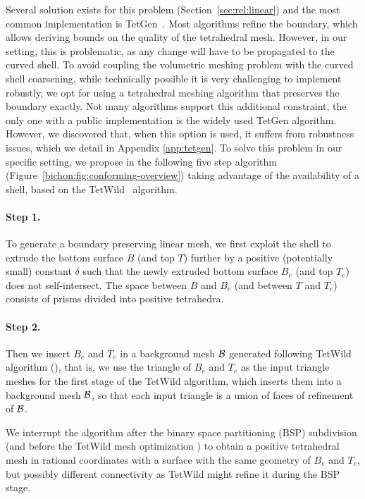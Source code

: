 Several solution exists for this problem (Section~\ref{sec:rel:linear}) and the most common implementation is TetGen~\cite{tetgen}. Most algorithms refine the boundary, which allows {deriving} bounds on the quality of the tetrahedral mesh. However, in our setting, this is problematic, as any change will have to be propagated to the curved shell. To avoid coupling the volumetric meshing problem with the curved shell coarsening, while technically possible it is very challenging to implement robustly, we opt for using a tetrahedral meshing algorithm that preserves the boundary exactly. Not many algorithms support this additional constraint, the only one with a public implementation is the widely used TetGen algorithm. However, we discovered that, when this option is used, it suffers from robustness issues, which we detail in Appendix \ref{app:tetgen}.
%
To solve this problem in our specific setting, we propose in the following five step algorithm (Figure~\ref{bichon:fig:conforming-overview}) taking advantage of the availability of a shell, based on the  TetWild~\cite{hu2018tetrahedral} algorithm. %

\paragraph{Step 1.}
To generate a boundary preserving linear mesh, we first exploit the shell to extrude the bottom surface $B$ (and top $T$) {further} by a positive (potentially small) constant $\delta$ such that the newly extruded bottom surface $B_e$ (and top $T_e$) does not self-intersect. The space between $B$ and $B_e$ (and between $T$ and $T_e$) consists of prisms {divided} into positive tetrahedra. 

\paragraph{Step 2.}
Then we insert $B_e$ and $T_e$ in a background mesh $\mathcal{B}$ generated following TetWild algorithm (\cite[Section 3.1]{hu2018tetrahedral}), that is, we use the triangle of $B_e$ and $T_e$ as the input triangle meshes for the first stage of the TetWild algorithm, which inserts them into a background mesh $\mathcal{B}$, so that
each input triangle is a union of faces of refinement of $\mathcal{B}$.


We interrupt the algorithm after the  binary space partitioning (BSP) subdivision (and before the TetWild mesh optimization \cite[Section 3.2]{hu2018tetrahedral})
to obtain a positive tetrahedral mesh in rational coordinates with a surface with the same geometry of $B_e$ and $T_e$, but possibly different connectivity as TetWild might refine it during the BSP stage.

